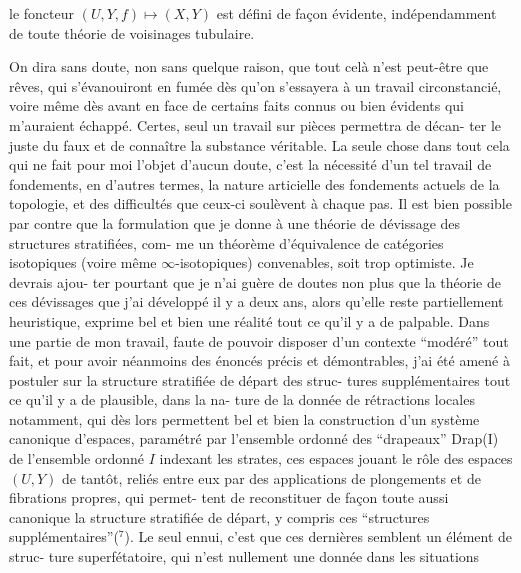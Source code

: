 
le foncteur  $(U,Y,f) \longmapsto (X,Y)$   est défini de façon évidente,
indépendamment de toute théorie de voisinages tubulaire.

On dira sans doute, non sans quelque raison, que tout
celà n'est peut-être que rêves, qui s'évanouiront en fumée dès
qu'on s'essayera à un travail circonstancié, voire même dès avant
en face de certains faits connus ou bien évidents qui m'auraient
échappé. Certes, seul un travail sur pièces permettra de décan-%
ter le juste du faux et de connaître la substance véritable. La
seule chose dans tout cela qui ne fait pour moi l'objet d'aucun
doute, c'est la nécessité d'un tel travail de fondements, en
d'autres termes, la nature articielle des fondements actuels de
la topologie, et des difficultés que ceux-ci soulèvent à chaque
pas. Il est bien possible par contre que la formulation que je
donne à une théorie de dévissage des structures stratifiées, com-%
me un théorème d'équivalence de catégories isotopiques (voire même
$\infty$-isotopiques) convenables, soit trop optimiste. Je devrais ajou-%
ter pourtant que je n'ai guère de doutes non plus que la théorie
de ces dévissages que j'ai développé il y a deux ans, alors qu'elle
reste partiellement heuristique, exprime bel et bien une réalité
tout ce qu'il y a de palpable. Dans une partie de mon travail,
faute de pouvoir disposer d'un contexte ``modéré'' tout fait, et
pour avoir néanmoins des énoncés précis et démontrables, j'ai été
amené à postuler sur la structure stratifiée de départ des struc-%
tures supplémentaires tout ce qu'il y a de plausible, dans la na-%
ture de la donnée de rétractions locales notamment, qui dès lors
permettent bel et bien la construction d'un système canonique
d'espaces, paramétré par l'ensemble ordonné des ``drapeaux'' Drap(I)
de l'ensemble ordonné  $I$  indexant les strates, ces espaces jouant
le rôle des espaces  $(U,Y)$  de tantôt, reliés entre eux par des
applications de plongements et de fibrations propres, qui permet-%
tent de reconstituer de façon toute aussi canonique la structure
stratifiée de départ, y compris ces ``structures supplémentaires''(${}^{7}$).
Le seul ennui, c'est que ces dernières semblent un élément de struc-%
ture superfétatoire, qui n'est nullement une donnée dans les situations

